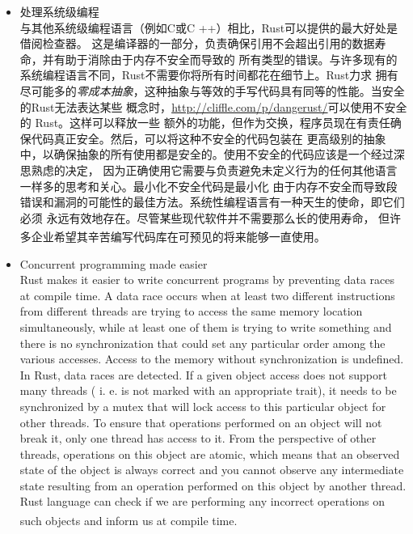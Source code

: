 \documentclass[UTF8,fontset=none,linespread=1.15]{ctexart}
\let\nosupcite\cite
\renewcommand*{\cite}[1]{\textsuperscript{\nosupcite{#1}}}
\begin{document}
\begin{itemize}
\item 处理系统级编程\\
  与其他系统级编程语言（例如C或C ++）相比，Rust可以提供的最大好处是借阅检查器。
  这是编译器的一部分，负责确保引用不会超出引用的数据寿命，并有助于消除由于内存不安全而导致的
  所有类型的错误。与许多现有的系统编程语言不同，Rust不需要你将所有时间都花在细节上。Rust力求
  拥有尽可能多的\textit{零成本抽象}，这种抽象与等效的手写代码具有同等的性能。当安全的Rust无法表达某些
  概念时，\url{http://cliffle.com/p/dangerust/}可以使用不安全的 Rust。这样可以释放一些
  额外的功能，但作为交换，程序员现在有责任确保代码真正安全。然后，可以将这种不安全的代码包装在
  更高级别的抽象中，以确保抽象的所有使用都是安全的。使用不安全的代码应该是一个经过深思熟虑的决定，
  因为正确使用它需要与负责避免未定义行为的任何其他语言一样多的思考和关心。最小化不安全代码是最小化
  由于内存不安全而导致段错误和漏洞的可能性的最佳方法。系统性编程语言有一种天生的使命，即它们必须
  永远有效地存在。尽管某些现代软件并不需要那么长的使用寿命，
  但许多企业希望其辛苦编写代码库在可预见的将来能够一直使用。\cite{bib:3-why-rust-pop}

\item Concurrent programming made easier\\
  Rust makes it easier to write concurrent programs by preventing data races at
  compile time. A data race occurs when at least two different instructions from
  different threads are trying to access the same memory location simultaneously,
  while at least one of them is trying to write something and there is no synchronization
  that could set any particular order among the various accesses. Access to the memory
  without synchronization is undefined. In Rust, data races are detected. If a given
  object access does not support many threads ( i. e. is not marked with an appropriate
  trait), it needs to be synchronized by a mutex that will lock access to this particular
  object for other threads. To ensure that operations performed on an object will not
  break it, only one thread has access to it. From the perspective of other threads,
  operations on this object are atomic, which means that an observed state of the
  object is always correct and you cannot observe any intermediate state resulting
  from an operation performed on this object by another thread. Rust language can
  check if we are performing any incorrect operations on such objects and inform
  us at compile time.\cite{bib:6-why-rust-pop-2}
\end{itemize}
\end{document}
